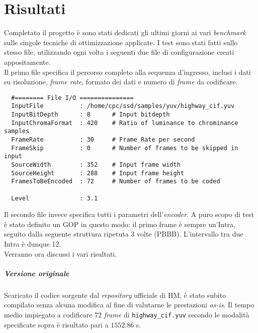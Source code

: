 
\chapter{Risultati} %

\label{Chapter7} %


Completato il progetto è sono stati dedicati gli ultimi giorni ai vari 
\emph{benchmark} sulle singole tecniche di ottimizzazione applicate. 
I test sono stati fatti sullo stesso file, utilizzando ogni volta i seguenti 
due file di configurazione creati appositamente.\\

Il primo file specifica il percorso completo alla sequenza d'ingresso, inclusi 
i dati su risoluzione, \emph{frame rate}, formato dei dati e numero di 
\emph{frame} da codificare.

\begin{lstlisting}
  #======== File I/O ===============
  InputFile          : /home/cpc/ssd/samples/yuv/highway_cif.yuv
  InputBitDepth      : 8      # Input bitdepth
  InputChromaFormat  : 420    # Ratio of luminance to chrominance samples
  FrameRate          : 30     # Frame Rate per second
  FrameSkip          : 0      # Number of frames to be skipped in input
  SourceWidth        : 352    # Input frame width
  SourceHeight       : 288    # Input frame height
  FramesToBeEncoded  : 72     # Number of frames to be coded
  
  Level              : 3.1
\end{lstlisting}

Il secondo file invece specifica tutti i parametri dell'\emph{encoder}. A puro 
scopo di test è stato definito un GOP in questo modo: il primo frame è sempre 
un'Intra, seguito dalla seguente struttura ripetuta 3 volte (PBBB). 
L'intervallo tra due Intra è dunque 12. \\

Verranno ora discussi i vari risultati.

\paragraph{Versione originale \\}
  Scaricato il codice sorgente dal \emph{repository} ufficiale di HM, è stato 
  subito compilato senza alcuna modifica al fine di valutarne le prestazioni 
  \emph{as-is}. Il tempo medio impiegato a codificare $72$ \emph{frame} di 
  \verb|highway_cif.yuv| secondo le modalità specificate sopra è risultato pari 
  a $1552.86$ s.

